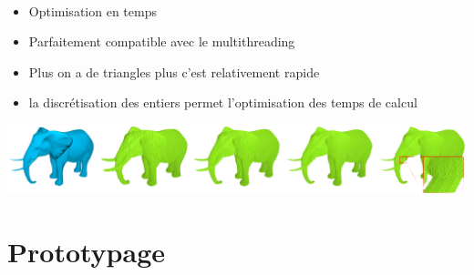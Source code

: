 \begin{frame}[fragile=singleslide]{\insertsectionhead}

  \framesubtitle{\insertsubsectionhead}
  \begin{itemize}
      \item Optimisation en temps
      \item Parfaitement compatible avec le multithreading
      \item Plus on a de triangles plus c'est relativement rapide
      \item la discrétisation des entiers permet l’optimisation des temps de calcul
    \end{itemize}
    \vspace{0.6cm}
    \begin{center}
        \includegraphics[scale=0.15]{resources/elephant.png}
    \end{center}
\end{frame}

\section{Prototypage}

